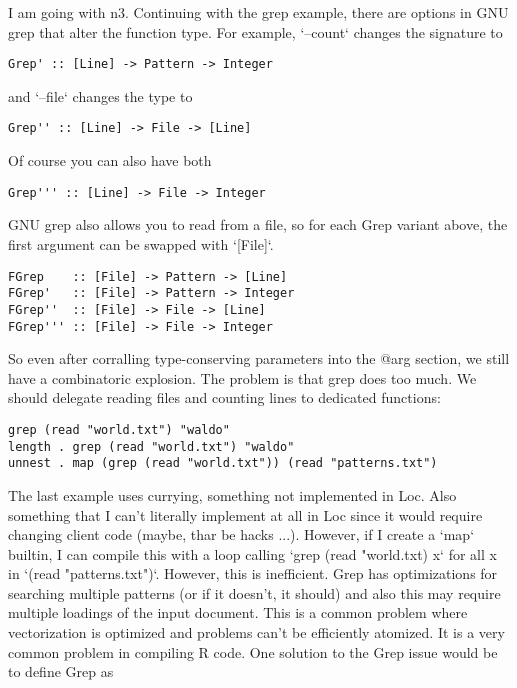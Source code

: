 \documentclass[12pt]{article}
\begin{document}
I am going with n3. Continuing with the grep example, there are options in GNU
grep that alter the function type. For example, `--count` changes the signature
to

\begin{verbatim}
Grep' :: [Line] -> Pattern -> Integer
\end{verbatim}

and `--file` changes the type to

\begin{verbatim}
Grep'' :: [Line] -> File -> [Line]
\end{verbatim}

Of course you can also have both

\begin{verbatim}
Grep''' :: [Line] -> File -> Integer
\end{verbatim}

GNU grep also allows you to read from a file, so for each Grep variant above,
the first argument can be swapped with `[File]`.

\begin{verbatim}
FGrep    :: [File] -> Pattern -> [Line]
FGrep'   :: [File] -> Pattern -> Integer
FGrep''  :: [File] -> File -> [Line]
FGrep''' :: [File] -> File -> Integer
\end{verbatim}

So even after corralling type-conserving parameters into the @arg section, we
still have a combinatoric explosion. The problem is that grep does too much. We
should delegate reading files and counting lines to dedicated functions:

\begin{verbatim}
grep (read "world.txt") "waldo"
length . grep (read "world.txt") "waldo"
unnest . map (grep (read "world.txt")) (read "patterns.txt")
\end{verbatim}

The last example uses currying, something not implemented in Loc. Also
something that I can't literally implement at all in Loc since it would require
changing client code (maybe, thar be hacks ...). However, if I create a `map`
builtin, I can compile this with a loop calling `grep (read "world.txt) x` for
all x in `(read "patterns.txt")`. However, this is inefficient. Grep has
optimizations for searching multiple patterns (or if it doesn't, it should) and
also this may require multiple loadings of the input document. This is a common
problem where vectorization is optimized and problems can't be efficiently
atomized. It is a very common problem in compiling R code. One solution to the
Grep issue would be to define Grep as
\end{document}
